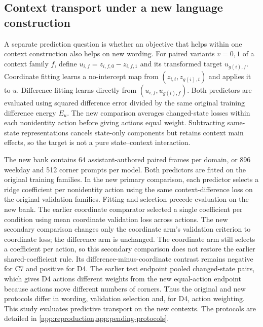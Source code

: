 \subsection{Context transport under a new language construction}
\label{sec:new-context}

A separate prediction question is whether an objective that helps within one context construction also helps on new wording. For paired variants $v=0,1$ of a context family $f$, define $u_{i,f}=z_{i,f,0}-z_{i,f,1}$ and its transformed target $u_{g(i),f}$. Coordinate fitting learns a no-intercept map from $(z_{i,t},z_{g(i),t})$ and applies it to $u$. Difference fitting learns directly from $(u_{i,f},u_{g(i),f})$. Both predictors are evaluated using squared difference error divided by the same original training difference energy $E_u$. The new comparison averages changed-state losses within each nonidentity action before giving actions equal weight. Subtracting same-state representations cancels state-only components but retains context main effects, so the target is not a pure state--context interaction.

The new bank contains 64 assistant-authored paired frames per domain, or 896 weekday and 512 corner prompts per model. Both predictors are fitted on the original training families. In the new primary comparison, each predictor selects a ridge coefficient per nonidentity action using the same context-difference loss on the original validation families. Fitting and selection precede evaluation on the new bank. The earlier coordinate comparator selected a single coefficient per condition using mean coordinate validation loss across actions. The new secondary comparison changes only the coordinate arm's validation criterion to coordinate loss; the difference arm is unchanged. The coordinate arm still selects a coefficient per action, so this secondary comparison does not restore the earlier shared-coefficient rule. Its difference-minus-coordinate contrast remains negative for C7 and positive for D4. The earlier test endpoint pooled changed-state pairs, which gives D4 actions different weights from the new equal-action endpoint because actions move different numbers of corners. Thus the original and new protocols differ in wording, validation selection and, for D4, action weighting. This study evaluates predictive transport on the new contexts. The protocols are detailed in \cref{app:reproduction,app:pending-protocols}.

